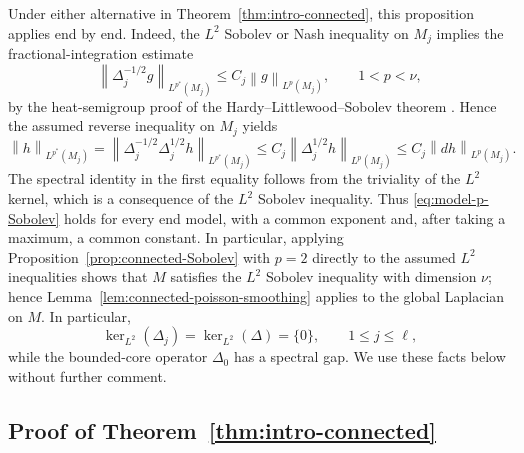 \documentclass[12pt]{amsart}
\newcommand{\norm}[2]{\left\lVert #1\right\rVert_{#2}}
\theoremstyle{remark}
\begin{document}
Under either alternative in Theorem~\ref{thm:intro-connected}, this proposition applies
end by end.  Indeed, the $L^2$ Sobolev or Nash inequality on $M_j$ implies the
fractional-integration estimate
\[
 \norm{\Delta_j^{-1/2}g}{L^{p^*}(M_j)}
 \leq C_j\norm g{L^p(M_j)},
 \qquad 1<p<\nu,
\]
by the heat-semigroup proof of the Hardy--Littlewood--Sobolev theorem
\cite{Varopoulos85}.  Hence the assumed reverse inequality on $M_j$ yields
\[
 \norm h{L^{p^*}(M_j)}
 =\norm{\Delta_j^{-1/2}\Delta_j^{1/2}h}{L^{p^*}(M_j)}
 \leq C_j\norm{\Delta_j^{1/2}h}{L^p(M_j)}
 \leq C_j\norm{dh}{L^p(M_j)}.
\]
The spectral identity in the first equality follows from the triviality of
the $L^2$ kernel, which is a consequence of the $L^2$ Sobolev inequality.
Thus \eqref{eq:model-p-Sobolev} holds for every end model, with a common
exponent and, after taking a maximum, a common constant.
In particular, applying Proposition~\ref{prop:connected-Sobolev} with $p=2$
directly to the assumed $L^2$ inequalities shows that $M$ satisfies the
$L^2$ Sobolev inequality with dimension $\nu$; hence
Lemma~\ref{lem:connected-poisson-smoothing} applies to the global Laplacian
on $M$.
In particular,
\[
 \ker_{L^2}(\Delta_j)=\ker_{L^2}(\Delta)=\{0\},
 \qquad 1\leq j\leq\ell,
\]
while the bounded-core operator $\Delta_0$ has a spectral gap.  We use these
facts below without further comment.

\subsection{Proof of Theorem~\ref{thm:intro-connected}}
\end{document}
